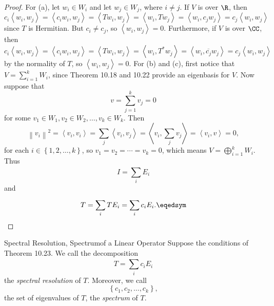 \documentclass[linearalgebra]{subfiles}
\begin{document}
    \begin{proof}
        For (a), let $w_i\in W_i$ and let $w_j\in W_j$, where $i\neq j$. If $V$ is over $\R$, then
        \begin{equation*}
            c_i\left\langle w_i, w_j\right\rangle = \left\langle c_iw_i, w_j\right\rangle = \left\langle Tw_i, w_j\right\rangle = \left\langle w_i, Tw_j\right\rangle = \left\langle w_i, c_jw_j\right\rangle = c_j\left\langle w_i, w_j\right\rangle 
        \end{equation*}
        since $T$ is Hermitian. But $c_i\neq c_j$, so $\left\langle w_i, w_j\right\rangle = 0$. Furthermore, if $V$ is over $\CC$, then
        \begin{equation*}
            c_i\left\langle w_i, w_j\right\rangle = \left\langle c_iw_i, w_j\right\rangle = \left\langle Tw_i, w_j\right\rangle = \left\langle w_i, T^*w_j\right\rangle = \left\langle w_i, \overline{c_j} w_j\right\rangle = c_j\left\langle w_i, w_j\right\rangle 
        \end{equation*}
        by the normality of $T$, so $\left\langle w_i, w_j\right\rangle = 0$. For (b) and (c), first notice that $V = \sum^{k}_{i=1} W_i$, since Theorem 10.18 and 10.22 provide an eigenbasis for $V$. Now suppose that
        \begin{equation*}
            v = \sum^{k}_{j=1} v_j = 0
        \end{equation*}
        for some $v_1\in W_1, v_2\in W_2, \ldots, v_k\in W_k$. Then
        \begin{equation*}
            \left\lVert v_i\right\rVert ^2 = \left\langle v_i, v_i\right\rangle = \sum^{}_{j} \left\langle v_i, v_j\right\rangle = \left\langle v_i, \sum^{}_{j} v_j\right\rangle = \left\langle v_i, v\right\rangle = 0,
        \end{equation*}
        for each $i\in \left\lbrace 1,2,\ldots,k \right\rbrace$, so $v_1=v_2=\cdots=v_k=0$, which means $V = \bigoplus^{k}_{i=1} W_i$. Thus
        \begin{equation*}
            I = \sum^{}_{i} E_i
        \end{equation*}
        and
        \begin{equation*}
            T = \sum^{}_{i} TE_i = \sum^{}_{i} c_iE_i. \eqedsym
        \end{equation*}
    \end{proof}

    \begin{definition}{Spectral Resolution, Spectrum}{of a Linear Operator}
        Suppose the conditions of Theorem 10.23. We call the decomposition
        \begin{equation*}
            T = \sum^{}_{i} c_iE_i
        \end{equation*}
        the \emph{spectral resolution} of $T$. Moreover, we call
        \begin{equation*}
            \left\lbrace c_1,c_2,\ldots,c_k \right\rbrace ,
        \end{equation*}
        the set of eigenvalues of $T$, the \emph{spectrum} of $T$.
    \end{definition}
\end{document}
